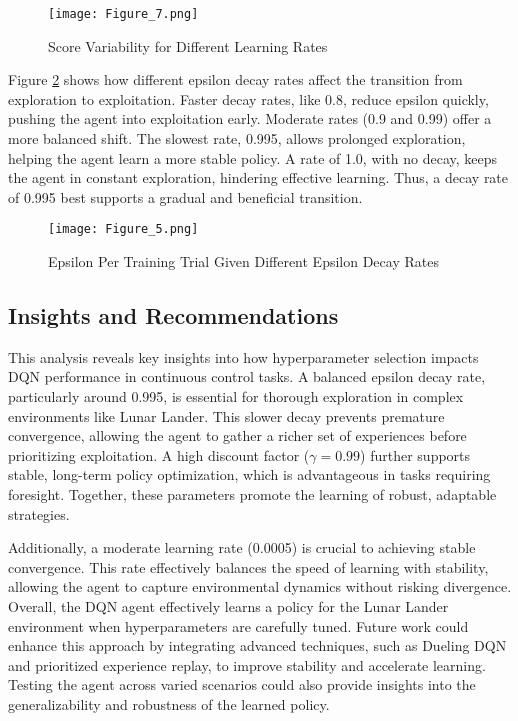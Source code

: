 \documentclass[conference]{IEEEtran}
\begin{document}
\begin{figure}[h]
    \centering
    \texttt{[image: Figure\_7.png]}
    \caption{Score Variability for Different Learning Rates}
    \label{fig:learning_rate_scores}
\end{figure}

Figure \ref{fig:epsilon_decay_rates} shows how different epsilon decay rates affect the transition from exploration to exploitation. Faster decay rates, like 0.8, reduce epsilon quickly, pushing the agent into exploitation early. Moderate rates (0.9 and 0.99) offer a more balanced shift. The slowest rate, 0.995, allows prolonged exploration, helping the agent learn a more stable policy. A rate of 1.0, with no decay, keeps the agent in constant exploration, hindering effective learning. Thus, a decay rate of 0.995 best supports a gradual and beneficial transition.

\begin{figure}[h]
    \centering
    \texttt{[image: Figure\_5.png]}
    \caption{Epsilon Per Training Trial Given Different Epsilon Decay Rates}
    \label{fig:epsilon_decay_rates}
\end{figure}


\subsection{Insights and Recommendations}
This analysis reveals key insights into how hyperparameter selection impacts DQN performance in continuous control tasks. A balanced epsilon decay rate, particularly around 0.995, is essential for thorough exploration in complex environments like Lunar Lander. This slower decay prevents premature convergence, allowing the agent to gather a richer set of experiences before prioritizing exploitation. A high discount factor ($\gamma = 0.99$) further supports stable, long-term policy optimization, which is advantageous in tasks requiring foresight. Together, these parameters promote the learning of robust, adaptable strategies.

Additionally, a moderate learning rate (0.0005) is crucial to achieving stable convergence. This rate effectively balances the speed of learning with stability, allowing the agent to capture environmental dynamics without risking divergence. Overall, the DQN agent effectively learns a policy for the Lunar Lander environment when hyperparameters are carefully tuned. Future work could enhance this approach by integrating advanced techniques, such as Dueling DQN and prioritized experience replay, to improve stability and accelerate learning. Testing the agent across varied scenarios could also provide insights into the generalizability and robustness of the learned policy.





\end{document}
